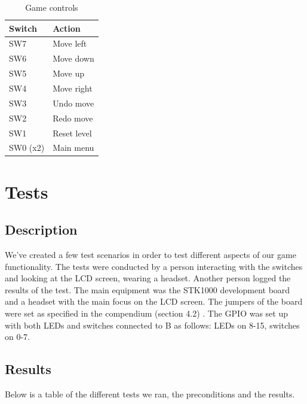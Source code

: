 \documentclass[a4paper,11pt]{article}
\begin{document}
\begin{table}[H]
\centering
\begin{tabular}{|l|l|}
\hline \textbf{Switch} & \textbf{Action} \\ 
\hline SW7 & Move left \\ 
\hline SW6 & Move down \\ 
\hline SW5 & Move up \\ 
\hline SW4 & Move right \\ 
\hline SW3 & Undo move \\ 
\hline SW2 & Redo move \\ 
\hline SW1 & Reset level \\ 
\hline SW0 (x2) & Main menu \\
\hline 
\end{tabular}
\caption{Game controls} 
\label{tab:gamecontrols}
\end{table}

\section{Tests}
\subsection{Description}
We've created a few test scenarios in order to test different aspects of our game functionality. The tests were conducted by a person interacting with the switches and looking at the LCD screen, wearing a headset. Another person logged the results of the test. The main equipment was the STK1000 development board and a headset with the main focus on the LCD screen. The jumpers of the board were set as specified in the compendium (section 4.2) \cite{komp}. The GPIO was set up with both LEDs and switches connected to B as follows: LEDs on 8-15, switches on 0-7. 

\subsection{Results}
Below is a table of the different tests we ran, the preconditions and the results. 
\end{document}
